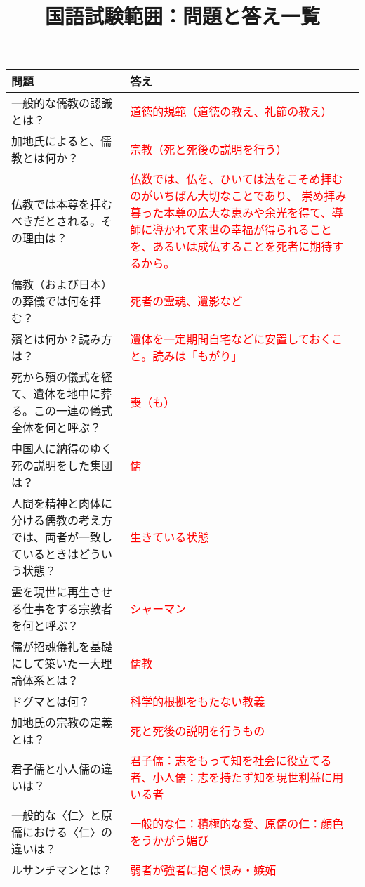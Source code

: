 \documentclass[a4paper,10pt]{article}
\title{国語試験範囲：問題と答え一覧}
\date{}
\begin{document}
\maketitle

\begin{longtable}{|p{}|p{}|}
\hline
\textbf{問題} & \textbf{答え} \\ \hline
一般的な儒教の認識とは？ & \textcolor{red}{道徳的規範（道徳の教え、礼節の教え）} \\ \hline
加地氏によると、儒教とは何か？ & \textcolor{red}{宗教（死と死後の説明を行う）} \\ \hline
仏教では本尊を拝むべきだとされる。その理由は？ & \textcolor{red}{仏数では、仏を、ひいては法をこそめ拝むのがいちばん大切なことであり、
崇め拝み暮った本尊の広大な恵みや余光を得て、導師に導かれて来世の幸福が得られることを、あるいは成仏することを死者に期待するから。} \\ \hline
儒教（および日本）の葬儀では何を拝む？ & \textcolor{red}{死者の霊魂、遺影など} \\ \hline
殯とは何か？読み方は？ & \textcolor{red}{遺体を一定期間自宅などに安置しておくこと。読みは「もがり」} \\ \hline
死から殯の儀式を経て、遺体を地中に葬る。この一連の儀式全体を何と呼ぶ？ & \textcolor{red}{喪（も）} \\ \hline
中国人に納得のゆく死の説明をした集団は？ & \textcolor{red}{儒} \\ \hline
人間を精神と肉体に分ける儒教の考え方では、両者が一致しているときはどういう状態？ & \textcolor{red}{生きている状態} \\ \hline
霊を現世に再生させる仕事をする宗教者を何と呼ぶ？ & \textcolor{red}{シャーマン} \\ \hline
儒が招魂儀礼を基礎にして築いた一大理論体系とは？ & \textcolor{red}{儒教} \\ \hline
ドグマとは何？ & \textcolor{red}{科学的根拠をもたない教義} \\ \hline
加地氏の宗教の定義とは？ & \textcolor{red}{死と死後の説明を行うもの} \\ \hline
君子儒と小人儒の違いは？ & \textcolor{red}{君子儒：志をもって知を社会に役立てる者、小人儒：志を持たず知を現世利益に用いる者} \\ \hline
一般的な〈仁〉と原儒における〈仁〉の違いは？ & \textcolor{red}{一般的な仁：積極的な愛、原儒の仁：顔色をうかがう媚び} \\ \hline
ルサンチマンとは？ & \textcolor{red}{弱者が強者に抱く恨み・嫉妬} \\ \hline

\end{longtable}
\end{document}
